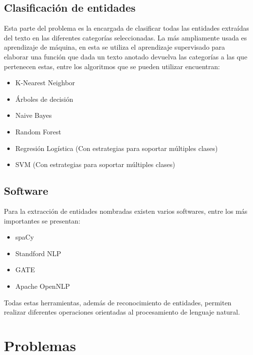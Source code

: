 \documentclass[runningheads]{llncs}
\begin{document}
\subsection{Clasificación de entidades}

Esta parte del problema es la encargada de clasificar todas las entidades extraídas del texto en las diferentes categorías seleccionadas. La más ampliamente usada es aprendizaje de máquina, en esta se utiliza el aprendizaje supervisado para elaborar una función que dada un texto anotado devuelva las categorías a las que pertenecen estas, entre los algoritmos que se pueden utilizar encuentran:

\begin{itemize}

\item K-Nearest Neighbor
\item Árboles de decisión
\item Naive Bayes
\item Random Forest
\item Regresión Logística (Con estrategias para soportar múltiples clases)
\item SVM (Con estrategias para soportar múltiples clases)

\end{itemize}

\subsection{Software}

Para la extracción de entidades nombradas existen varios softwares, entre los más importantes se presentan:

\begin{itemize}

\item spaCy \cite{spacy_nlp}
\item Standford NLP \cite{standford_nlp}
\item GATE \cite{gate_nlp}
\item Apache OpenNLP \cite{open_nlp}

\end{itemize}

Todas estas herramientas, además de reconocimiento de entidades, permiten realizar diferentes operaciones orientadas al procesamiento de lenguaje natural.

\section{Problemas}
\end{document}
